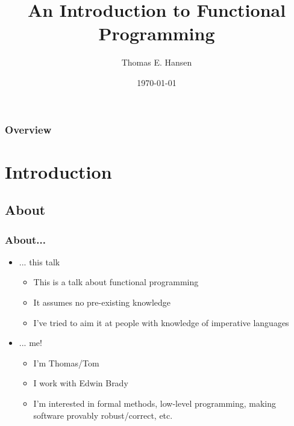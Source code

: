 \documentclass{beamer}
\title{An Introduction to Functional Programming}
\author{Thomas E. Hansen}
\institute{University of St Andrews}
\date{\today}
\begin{document}
\begin{frame}[plain]
  \titlepage
\end{frame}

\begin{frame}
  \frametitle{Overview}
  \tableofcontents
\end{frame}

\section{Introduction}
  \subsection{About}
  \begin{frame}
    \frametitle{About...}
    \begin{itemize}
      \item ... this talk
            \begin{itemize}
              \item This is a talk about functional programming
              \item It assumes no pre-existing knowledge
              \item I've tried to aim it at people with knowledge of imperative
                    languages
            \end{itemize}
      \item ... me!
            \begin{itemize}
              \item I'm Thomas/Tom
              \item I work with Edwin Brady
              \item I'm interested in formal methods, low-level programming,
                    making software provably robust/correct, etc.
            \end{itemize}
    \end{itemize}
  \end{frame}
\end{document}
